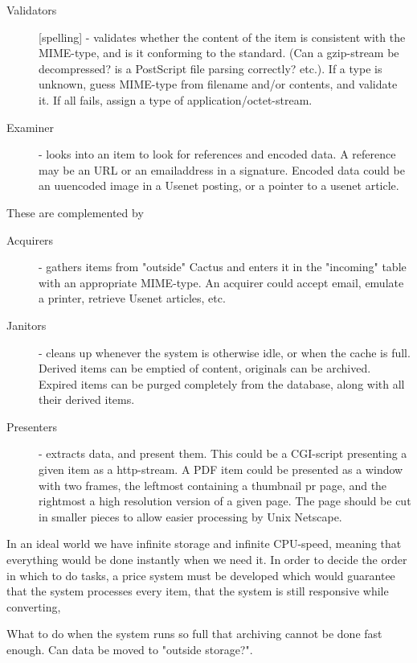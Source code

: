 \begin{description}
\item[Validators] [spelling] - validates whether the content of the
  item is consistent with the MIME-type, and is it conforming to the
  standard.  (Can a gzip-stream be decompressed? is a PostScript file
  parsing correctly? etc.).  If a type is unknown, guess MIME-type
  from filename and/or contents, and validate it.  If all fails,
  assign a type of application/octet-stream.

\item[Examiner] - looks into an item to look for references and
  encoded data.  A reference may be an URL or an emailaddress in a
  signature.  Encoded data could be an uuencoded image in a Usenet
  posting, or a pointer to a usenet article.
\end{description}

These are complemented by

\begin{description}
\item[Acquirers] - gathers items from "outside" Cactus and enters it
  in the "incoming" table with an appropriate MIME-type.  An acquirer
  could accept email, emulate a printer, retrieve Usenet articles,
  etc.

\item[Janitors] - cleans up whenever the system is otherwise idle, or
  when the cache is full.  Derived items can be emptied of content,
  originals can be archived.  Expired items can be purged completely
  from the database, along with all their derived items.

\item[Presenters] - extracts data, and present them.  This could be a
  CGI-script presenting a given item as a http-stream.  A PDF item
  could be presented as a window with two frames, the leftmost
  containing a thumbnail pr page, and the rightmost a high resolution
  version of a given page.  The page should be cut in smaller pieces
  to allow easier processing by Unix Netscape.
\end{description}

In an ideal world we have infinite storage and infinite CPU-speed,
meaning that everything would be done instantly when we need it.  In
order to decide the order in which to do tasks, a price system must be
developed which would guarantee that the system processes every item,
that the system is still responsive while converting,


What to do when the system runs so full that archiving cannot be done
fast enough.  Can data be moved to "outside storage?".



